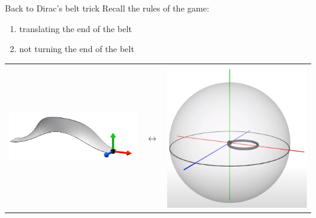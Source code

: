 \documentclass[10pt]{beamer}
\begin{document}
\begin{frame}{Back to Dirac's belt trick}
  Recall the rules of the game:
  \begin{enumerate}
    \item translating the end of the belt
    \item not turning the end of the belt
  \end{enumerate}
  \begin{center}
    \begin{tabular}{m{3cm} m{1cm} m{3cm}}
        \includegraphics[scale=0.15]{Pictures/contractiblepathbelt.png} & $\longleftrightarrow$ & \includegraphics[scale=0.1]{Pictures/contractiblepathsphere.png} \\

\end{tabular}
\end{center}
\end{frame}
\end{document}
